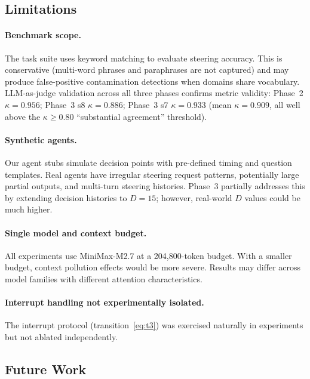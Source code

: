 \documentclass{article}
\begin{document}
\subsection{Limitations}

\paragraph{Benchmark scope.}
The task suite uses keyword matching to evaluate steering accuracy.
This is conservative (multi-word phrases and paraphrases are not captured)
and may produce false-positive contamination detections when domains share
vocabulary.
LLM-as-judge validation across all three phases confirms metric validity:
Phase~2 $\kappa=0.956$; Phase~3 s8 $\kappa=0.886$; Phase~3 s7
$\kappa=0.933$ (mean $\kappa=0.909$, all well above the $\kappa{\geq}0.80$
``substantial agreement'' threshold).

\paragraph{Synthetic agents.}
Our agent stubs simulate decision points with pre-defined timing and
question templates.
Real agents have irregular steering request patterns, potentially large
partial outputs, and multi-turn steering histories.
Phase~3 partially addresses this by extending decision histories to $D=15$;
however, real-world $D$ values could be much higher.

\paragraph{Single model and context budget.}
All experiments use MiniMax-M2.7 at a 204{,}800-token budget.
With a smaller budget, context pollution effects would be more severe.
Results may differ across model families with different attention
characteristics.

\paragraph{Interrupt handling not experimentally isolated.}
The interrupt protocol (transition~\eqref{eq:t3}) was exercised naturally in
experiments but not ablated independently.

\subsection{Future Work}
\end{document}
